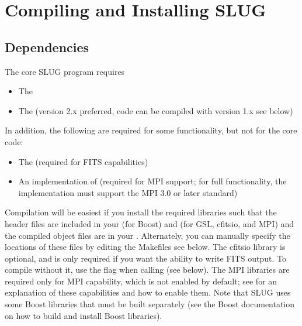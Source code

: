 \documentclass[letterpaper,10pt,english]{sphinxmanual}
\begin{document}
\chapter{Compiling and Installing SLUG}
\label{\detokenize{compiling:compiling-and-installing-slug}}\label{\detokenize{compiling::doc}}

\section{Dependencies}
\label{\detokenize{compiling:dependencies}}
The core SLUG program requires
\begin{itemize}
\item {} 
The 

\item {} 
The  (version 2.x preferred, code can be compiled with version 1.x \textendash{} see below)

\end{itemize}

In addition, the following are required for some functionality, but not for the core code:
\begin{itemize}
\item {} 
The  (required for FITS capabilities)

\item {} 
An implementation of  (required for MPI support; for full functionality, the implementation must support the MPI 3.0 or later standard)

\end{itemize}

Compilation will be easiest if you install the required libraries such that the header files are included in your  (for Boost) and  (for GSL, cfitsio, and MPI) and the compiled object files are in your . Alternately, you can manually specify the locations of these files by editing the Makefiles \textendash{} see below. The cfitsio library is optional, and is only required if you want the ability to write FITS output. To compile without it, use the flag  when calling  (see below). The MPI libraries are required only for MPI capability, which is not enabled by default; see {\hyperref[\detokenize{library:ssec-mpi-support}]{}} for an explanation of these capabilities and how to enable them. Note that SLUG uses some Boost libraries that must be built separately (see the Boost documentation on how to build and install Boost libraries).
\end{document}

